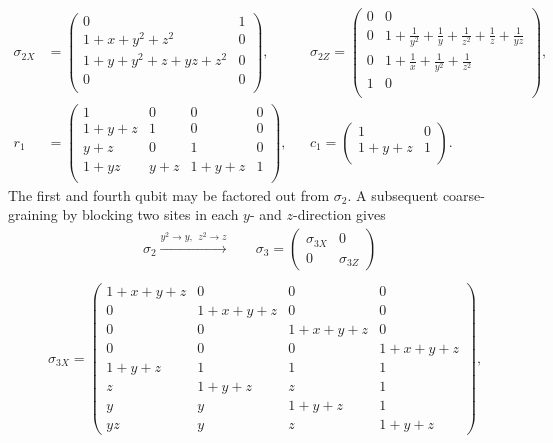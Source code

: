 \begin{align*}
\sigma_{2X} &=
\left(\begin{array}{c|c}
 0 & 1 \\
\hline
 1+x+y^2+z^2 & 0  \\
 1+y+y^2+z+y z+z^2 & 0  \\
\hline
 0 & 0  \\
\end{array}\right),
& &
\sigma_{2Z} =
\left(
\begin{array}{c|c}
 0 & 0 \\
\hline
0 & 1+\frac{1}{y^2}+\frac{1}{y}+\frac{1}{z^2}+\frac{1}{z}+\frac{1}{y z} \\
0 & 1+\frac{1}{x}+\frac{1}{y^2}+\frac{1}{z^2} \\
\hline
1 & 0 \\
\end{array}
\right) ,
\\
 r_1 &= 
\begin{pmatrix}
 1     & 0   & 0     & 0 \\
 1+y+z & 1   & 0     & 0 \\
 y+z   & 0   & 1     & 0 \\  
 1+y z & y+z & 1+y+z & 1 \\
\end{pmatrix},
& &
c_1 =
\begin{pmatrix}
 1     & 0 \\
 1+y+z & 1 \\
\end{pmatrix}.
\end{align*}
The first and fourth qubit may be factored out from $\sigma_2$.
A subsequent coarse-graining by blocking two sites in each $y$- and $z$-direction gives
\begin{align*}
\sigma_2 \xrightarrow{y^2 \to y,~~z^2 \to z} \quad
& \sigma_3 = \begin{pmatrix} \sigma_{3X} & 0 \\ 0 & \sigma_{3Z} \end{pmatrix} \\
\end{align*}
\begin{align*}
& \sigma_{3X} =
\begin{pmatrix}
 1+x+y+z & 0 & 0 & 0 \\
 0 & 1+x+y+z & 0 & 0 \\
 0 & 0 & 1+x+y+z & 0 \\
 0 & 0 & 0 & 1+x+y+z \\
 1+y+z & 1 & 1 & 1 \\
 z & 1+y+z & z & 1 \\
 y & y & 1+y+z & 1 \\
 y z & y & z & 1+y+z
\end{pmatrix},
\end{align*}
